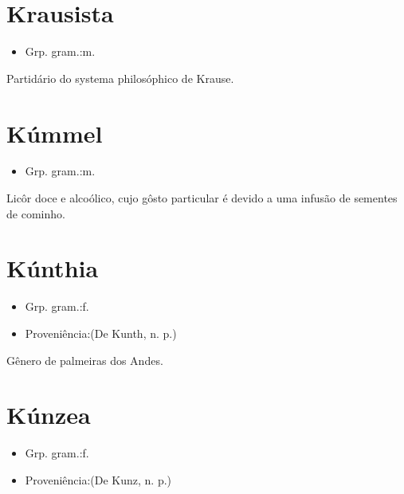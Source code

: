 \documentclass{article}
\begin{document}
\section{Krausista}
\begin{itemize}
\item {Grp. gram.:m.}
\end{itemize}
Partidário do systema philosóphico de Krause.
\section{Kúmmel}
\begin{itemize}
\item {Grp. gram.:m.}
\end{itemize}
Licôr doce e alcoólico, cujo gôsto particular é devido a uma infusão de sementes de cominho.
\section{Kúnthia}
\begin{itemize}
\item {Grp. gram.:f.}
\end{itemize}
\begin{itemize}
\item {Proveniência:(De \textunderscore Kunth\textunderscore , n. p.)}
\end{itemize}
Gênero de palmeiras dos Andes.
\section{Kúnzea}
\begin{itemize}
\item {Grp. gram.:f.}
\end{itemize}
\begin{itemize}
\item {Proveniência:(De \textunderscore Kunz\textunderscore , n. p.)}
\end{itemize}
\end{document}
